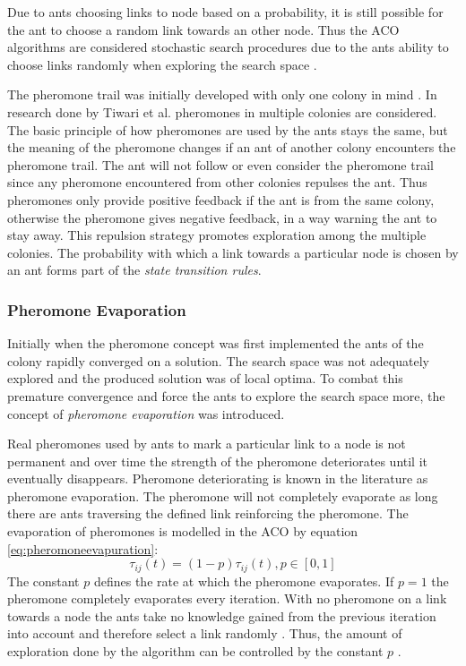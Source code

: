 Due to ants choosing links to node based on a probability, it is still possible for the ant to choose a random link towards an other node. Thus the \gls{ACO} algorithms are considered stochastic search procedures due to the ants ability to choose links randomly when exploring the search space \cite{ACOSurvey,ImpACOComplex}.

The pheromone trail was initially developed with only one colony in mind \cite{CompuIntelligenceIntro}. In research done by Tiwari et al.\cite{ACOLargeProblem} pheromones in multiple colonies are considered. The basic principle of how pheromones are used by the ants stays the same, but the meaning of the pheromone changes if an ant of another colony encounters the pheromone trail\cite{AntQAP,AntsAndStigmergy,CompuIntelligenceIntro}. The ant will not follow or even consider the pheromone trail since any pheromone encountered from other colonies repulses the ant\cite{ACOLargeProblem}. Thus pheromones only provide positive feedback if the ant is from the same colony, otherwise the pheromone gives negative feedback, in a way warning the ant to stay away\cite{ACOLargeProblem}. This repulsion strategy promotes exploration among the multiple colonies\cite{ACOLargeProblem}. The probability with which a link towards a particular node is chosen by an ant forms part of the \emph{state transition rules}.

\subsubsection{Pheromone Evaporation}
\label{sec:pheromoneevapuation}
Initially when the pheromone concept was first implemented the ants of the colony rapidly converged on a solution\cite{CompuIntelligenceIntro}. The search space was not adequately explored and the produced solution was of local optima\cite{AntsAndStigmergy}. To combat this premature convergence and force the ants to explore the search space more, the concept of \emph{pheromone evaporation} was introduced\cite{AntIntroTrends,AntSurvey}. 

Real pheromones used by ants to mark a particular link to a node is not permanent and over time the strength of the pheromone deteriorates until it eventually disappears\cite{CompuIntelligenceIntro}. Pheromone deteriorating is known in the literature as pheromone evaporation\cite{CompuIntelligenceIntro}. The pheromone will not completely evaporate as long there are ants traversing the defined link reinforcing the pheromone. The evaporation of pheromones is modelled in the \gls{ACO} by equation \ref{eq:pheromoneevapuration}\cite{AntIntroTrends,AntSurvey}:
\begin{equation}
\label{eq:pheromoneevapuration}
	\tau_{ij}(t) = (1-p)\tau_{ij}(t), p\in [0,1]
\end{equation}
The constant $p$ defines the rate at which the pheromone evaporates. If $p=1$ the pheromone completely evaporates every iteration. With no pheromone on a link towards a node the ants take no knowledge gained from the previous iteration into account and therefore select a link randomly \cite{CompuIntelligenceIntro,AntsAndStigmergy}. Thus, the amount of exploration done by the algorithm can be controlled by the constant $p$ \cite{CompuIntelligenceIntro,AntsAndStigmergy}.


